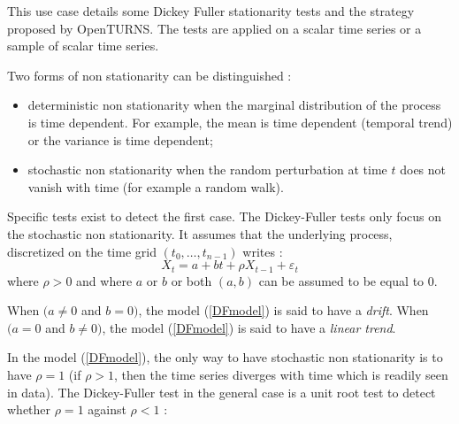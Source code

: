 \renewcommand{\filename}{docUC_StocProc_DickeyFuller.tex}
\renewcommand{\filetitle}{UC : Dickey Fuller stationarity tests}

\HeaderIIILevel

\label{DickeyFuller}


This use case details some Dickey Fuller stationarity tests and the strategy proposed by OpenTURNS. The tests are applied on a scalar time series or a sample of scalar time series.

Two forms of non stationarity can be distinguished :
\begin{itemize}
\item deterministic non stationarity when the marginal distribution of the process is time dependent. For example, the mean  is time dependent (temporal trend) or the variance is time dependent;
\item stochastic non stationarity when the random perturbation at time $t$ does not vanish with time (for example a random walk).
\end{itemize}

Specific tests exist to detect the first case. The  Dickey-Fuller tests only focus on the stochastic non stationarity. It assumes that the underlying process, discretized on the time grid $(t_0, \dots, t_{n-1})$  writes :
\begin{equation}\label{DFmodel}
  X_t = a + bt + \rho X_{t-1} + \varepsilon_{t}
\end{equation}
where $\rho > 0$ and where $a$ or $b$ or both $(a,b)$ can be assumed to be equal to 0.

When $(a \neq 0$ and $b=0)$, the model (\ref{DFmodel}) is said to have a \emph{drift}. When $(a = 0$ and $b \neq 0)$, the model (\ref{DFmodel}) is said to have a \emph{linear trend}.

In the  model (\ref{DFmodel}), the only way to have  stochastic non stationarity is to have $\rho = 1$ (if $\rho > 1$, then the time series diverges with time which is readily seen in data). The Dickey-Fuller test in the general case is a unit root test to detect whether $\rho=1$ against $\rho < 1$ :

